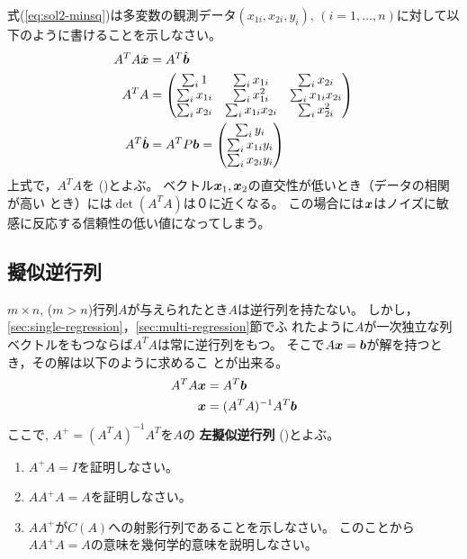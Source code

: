 \documentclass[twocolumn,11pt]{jarticle}
\begin{document}
\question
式(\ref{eq:sol2-minsq})は多変数の観測データ$(x_{1i},x_{2i},y_i)$,
$(i=1,...,n)$に対して以下のように書けることを示しなさい。
\begin{align}
  \label{eq:multi-regression}
  A^TA\hat{\boldsymbol{x}}&=A^T\hat{\boldsymbol{b}}\\
  A^TA&=
  \begin{pmatrix}
    \sum_i1   &  \sum_ix_{1i} &  \sum_ix_{2i} \\
    \sum_ix_{1i} &  \sum_ix_{1i}^2 &  \sum_ix_{1i}x_{2i} \\
    \sum_ix_{2i} &  \sum_ix_{1i}x_{2i} & \sum_ix_{2i}^2 
  \end{pmatrix}\notag\\
  A^T\hat{\boldsymbol{b}}
  &=A^TP\boldsymbol{b}=
  \begin{pmatrix}
    \sum_iy_i\\ \sum_ix_{1i}y_i\\ \sum_ix_{2i}y_i
  \end{pmatrix}\notag
\end{align}
\comment
上式で，$A^TA$を
()とよぶ。
ベクトル$\boldsymbol{x}_1,\boldsymbol{x}_2$の直交性が低いとき（データの相関が高い
とき）には$\det(A^TA)$は０に近くなる。
この場合には$\boldsymbol{x}$はノイズに敏感に反応する信頼性の低い値になってしまう。%

\subsection{擬似逆行列\prog}
$m\times n$, ($m>n$)行列$A$が与えられたとき$A$は逆行列を持たない。
しかし，\ref{sec:single-regression}，\ref{sec:multi-regression}節でふ
れたように$A$が一次独立な列ベクトルをもつならば$A^TA$は常に逆行列をもつ。
そこで$A\boldsymbol{x}=\boldsymbol{b}$が解を持つとき，その解は以下のように求めるこ
とが出来る。
\begin{align}
  A^TA{\boldsymbol{x}}&=A^T{\boldsymbol{b}}\notag\\
  {\boldsymbol{x}}&=(A^TA)^{-1}A^T{\boldsymbol{b}}\notag
\end{align}
ここで, $A^{+}=(A^TA)^{-1}A^T$を$A$の
\textbf{左擬似逆行列}
()とよぶ。 

\question
\begin{enumerate}
\item $A^{+}A=I$を証明しなさい。
\item $AA^{+}A=A$を証明しなさい。
\item $AA^{+}$が$C(A)$への射影行列であることを示しなさい。
  このことから$AA^{+}A=A$の意味を幾何学的意味を説明しなさい。
\end{enumerate}
\end{document}
